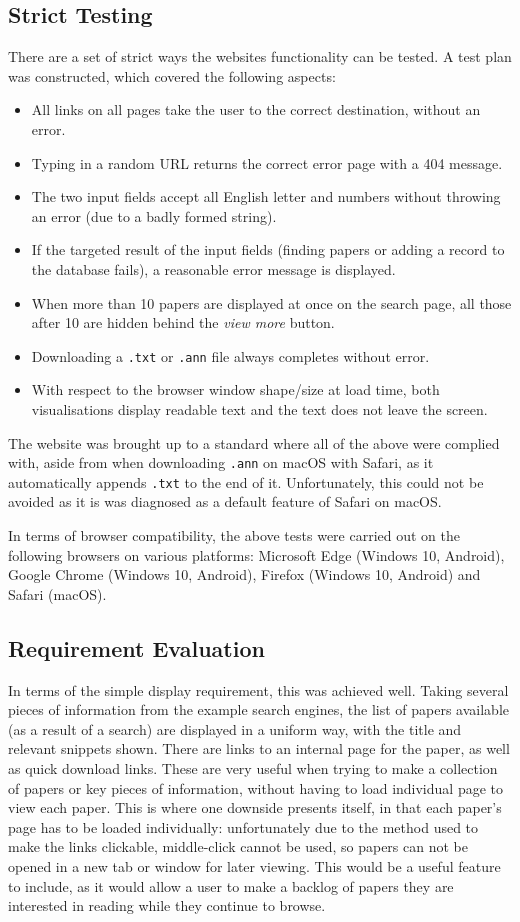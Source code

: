 \subsection*{Strict Testing}
There are a set of strict ways the websites functionality can be tested. A test plan was constructed, which covered the following aspects:
\begin{itemize}
	\item All links on all pages take the user to the correct destination, without an error.
	\item Typing in a random URL returns the correct error page with a 404 message.
	\item The two input fields accept all English letter and numbers without throwing an error (due to a badly formed string).
	\item If the targeted result of the input fields (finding papers or adding a record to the database fails), a reasonable error message is displayed.
	\item When more than 10 papers are displayed at once on the search page, all those after 10 are hidden behind the \textit{view more} button.
	\item Downloading a \texttt{.txt} or \texttt{.ann} file always completes without error.
	\item With respect to the browser window shape/size at load time, both visualisations display readable text and the text does not leave the screen.
\end{itemize}

The website was brought up to a standard where all of the above were complied with, aside from when downloading \texttt{.ann} on macOS with Safari, as it automatically appends \texttt{.txt} to the end of it. Unfortunately, this could not be avoided as it is was diagnosed as a default feature of Safari on macOS.

In terms of browser compatibility, the above tests were carried out on the following browsers on various platforms: Microsoft Edge (Windows 10, Android), Google Chrome (Windows 10, Android), Firefox (Windows 10, Android) and Safari (macOS). 

\subsection*{Requirement Evaluation}
In terms of the simple display requirement, this was achieved well. Taking several pieces of information from the example search engines, the list of papers available (as a result of a search) are displayed in a uniform way, with the title and relevant snippets shown. There are links to an internal page for the paper, as well as quick download links. These are very useful when trying to make a collection of papers or key pieces of information, without having to load individual page to view each paper. This is where one downside presents itself, in that each paper's page has to be loaded individually: unfortunately due to the method used to make the links clickable, middle-click cannot be used, so papers can not be opened in a new tab or window for later viewing. This would be a useful feature to include, as it would allow a user to make a backlog of papers they are interested in reading while they continue to browse.

